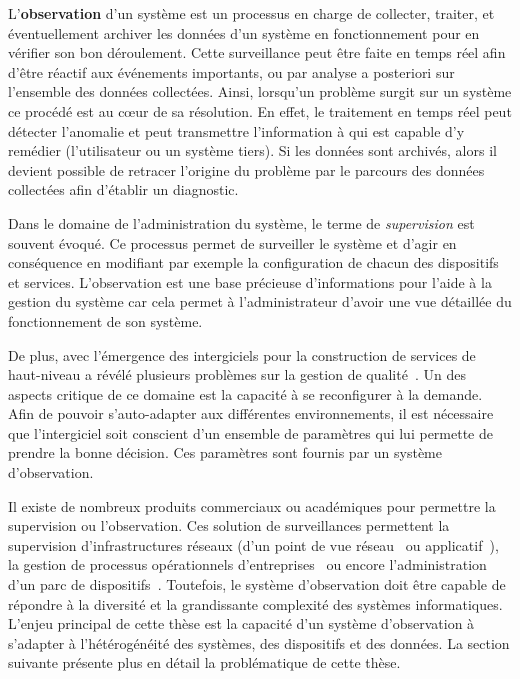 L'\textbf{observation} d'un système est un processus en charge de collecter, traiter, et éventuellement archiver les données d'un système en fonctionnement pour en vérifier son bon déroulement. Cette surveillance peut être faite en temps réel afin d'être réactif aux événements importants, ou par analyse a posteriori sur l'ensemble des données collectées. Ainsi, lorsqu'un problème surgit sur un système ce procédé est au cœur de sa résolution. En effet, le traitement en temps réel peut détecter l'anomalie et peut transmettre l'information à qui est capable d'y remédier (l'utilisateur ou un système tiers). Si les données sont archivés, alors il devient possible de retracer l'origine du problème par le parcours des données collectées afin d'établir un diagnostic.

Dans le domaine de l'administration du système, le terme de \textit{supervision} est souvent évoqué. Ce processus permet de surveiller le système et d'agir en conséquence en modifiant par exemple la configuration de chacun des dispositifs et services. L'observation est une base précieuse d'informations pour l'aide à la gestion du système car cela permet à l'administrateur d'avoir une vue détaillée du fonctionnement de son système.

De plus, avec l'émergence des intergiciels pour la construction de services de haut-niveau a révélé plusieurs problèmes sur la gestion de qualité~\cite{Geihs:challenges}. Un des aspects critique de ce domaine est la capacité à se reconfigurer à la demande. Afin de pouvoir s'auto-adapter aux différentes environnements, il est nécessaire que l'intergiciel soit conscient d'un ensemble de paramètres qui lui permette de prendre la bonne décision. Ces paramètres sont fournis par un système d'observation.

Il existe de nombreux produits commerciaux ou académiques pour permettre la supervision ou l'observation. Ces solution de surveillances permettent la supervision d'infrastructures réseaux (d'un point de vue réseau~\cite{url:zabbix} ou applicatif~\cite{url:manageengine}), la gestion de processus opérationnels d'entreprises~\cite{url:systar} ou encore l'administration d'un parc de dispositifs~\cite{IETF:SNMP}. Toutefois, le système d'observation doit être capable de répondre à la diversité et la grandissante complexité des systèmes informatiques. L'enjeu principal de cette thèse est la capacité d'un système d'observation à s'adapter à l'hétérogénéité des systèmes, des dispositifs et des données. La section suivante présente plus en détail la problématique de cette thèse.